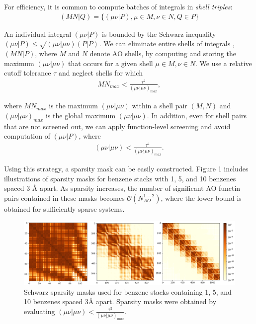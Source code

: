 For efficiency, it is common to compute batches of integrals in \textit{shell triples}: 
\begin{align} 
(M N | Q) = \{(\mu \nu|P), \mu \in M, \nu \in N, Q \in P\} 
\end{align} 

\noindent An individual integral $(\mu \nu | P)$ is bounded by the Schwarz inequality $(\mu \nu | P) \leq 
\sqrt{(\mu \nu | \mu \nu)(P|P)}$. We can eliminate entire shells of integrals , $(MN|P)$, where $M$ and $N$ denote AO shells, by computing
and storing the maximum $(\mu \nu | \mu \nu)$ that occurs for a given shell $\mu \in M, \nu \in N$. We use a relative cutoff tolerance
$\tau$ and neglect shells for which 
\begin{align}
MN_{max} < \frac{\tau^2}{(\mu \nu | \mu \nu)_{max}},
\end{align}

where $MN_{max}$ is the maximum $(\mu \nu | \mu \nu)$
within a shell pair $(M, N)$ and $(\mu \nu | \mu \nu)_{max}$ is the global maximum $(\mu \nu | \mu \nu)$. In addition, even for shell pairs
that are not screened out, we can apply function-level screening and avoid computation of $(\mu \nu | P)$, where
\begin{align}
(\mu \nu | \mu \nu) < \frac{\tau^2}{(\mu \nu | \mu \nu)_{max}}.
\end{align}

Using this strategy, a sparsity mask can be easily constructed. Figure 1 includes
illustrations of sparsity masks for benzene stacks with 1, 5, and 10 benzenes spaced 3 {\AA} apart. As sparsity increases, the number of
significant AO functin pairs contained in these masks becomes $\mathcal{O}(N_{AO}^{1-2})$, where the lower bound is obtained for 
sufficiently sparse systems. 

\begin{figure}[H] 
\centering
\includegraphics[scale=0.2]{figures/sparsity_plots/sparsity_masks.png} \caption{Schwarz sparsity masks used for benzene stacks containing 
1, 5, and 10 benzenes spaced 3Å apart. Sparsity masks were obtained by evaluating $(\mu\nu|\mu\nu)<\frac{\tau^2}{(\mu\nu|\mu\nu)_{max}}$.}
\label{fig:databases} \end{figure}


